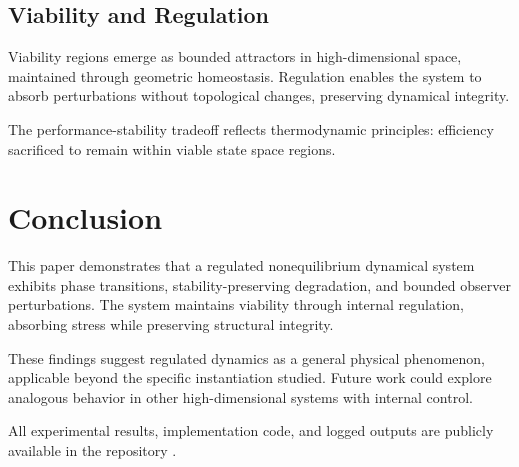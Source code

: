 \documentclass[12pt,a4paper]{report}
\begin{document}
\subsection{Viability and Regulation}

Viability regions emerge as bounded attractors in high-dimensional space, maintained through geometric homeostasis. Regulation enables the system to absorb perturbations without topological changes, preserving dynamical integrity.

The performance-stability tradeoff reflects thermodynamic principles: efficiency sacrificed to remain within viable state space regions.

\section{Conclusion}

This paper demonstrates that a regulated nonequilibrium dynamical system exhibits phase transitions, stability-preserving degradation, and bounded observer perturbations. The system maintains viability through internal regulation, absorbing stress while preserving structural integrity.

These findings suggest regulated dynamics as a general physical phenomenon, applicable beyond the specific instantiation studied. Future work could explore analogous behavior in other high-dimensional systems with internal control.

All experimental results, implementation code, and logged outputs are publicly available in the repository \cite{SpiralBrainRepo}.



\end{document}
